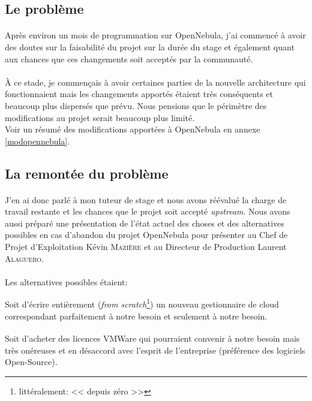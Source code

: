 \subsection{Le problème}

\paragraph*{}
Après environ un mois de programmation sur OpenNebula, j'ai commencé à avoir des doutes sur la faisabilité du projet sur la durée du stage et
également quant aux chances que ces changements soit acceptés par la communauté.

\paragraph*{}
À ce stade, je commençais à avoir certaines parties de la nouvelle architecture qui fonctionnaient mais les changements apportés étaient très
conséquents et beaucoup plus dispersés que prévu. Nous pensions que le périmètre des modifications au projet serait beaucoup plus limité.\\
Voir un résumé des modifications apportées à OpenNebula en annexe \ref{modopennebula}.

\subsection{La remontée du problème}

\paragraph*{}
J'en ai donc parlé à mon tuteur de stage et nous avons réévalué la charge de travail restante et les chances que le projet soit accepté \emph{upstream}.
Nous avons aussi préparé une présentation de l'état actuel des choses et des alternatives possibles en cas d'abandon du projet OpenNebula pour
présenter au Chef de Projet d'Exploitation Kévin \textsc{Mazière} et au Directeur de Production Laurent \textsc{Alaguero}.

\paragraph*{}
Les alternatives possibles étaient:
\begin{listi}
    \item Soit d'écrire entièrement (\emph{from scratch}\footnote{littéralement: << depuis zéro >>}) un nouveau gestionnaire de
cloud correspondant parfaitement à notre besoin et seulement à notre besoin.
    \item Soit d'acheter des licences VMWare\textsuperscript{\textregistered} qui pourraient
convenir à notre besoin mais très onéreuses et en désaccord avec l'esprit de l'entreprise (préférence des logiciels Open-Source).
\end{listi}


